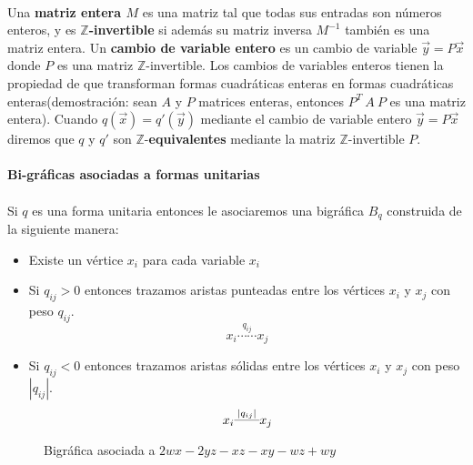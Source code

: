 \paragraph*{}
Una \textbf{matriz entera $M$} es una matriz tal que todas sus entradas son números enteros, y es $\mathbb{Z}$\textbf{-invertible} si además su matriz inversa $M^{-1}$ también es una matriz entera. Un \textbf{cambio de variable entero} es un cambio de variable $\overrightarrow{y} = P\overrightarrow{x}$ donde $P$ es una matriz $\mathbb{Z}$-invertible. Los cambios de variables enteros tienen la propiedad de que transforman formas cuadráticas enteras en formas cuadráticas enteras(demostración: sean $A$ y $P$ matrices enteras, entonces $P^{T}~A~P$ es una matriz entera). Cuando $q(\overrightarrow{x}) = q'(\overrightarrow{y})$ mediante el cambio de variable entero $\overrightarrow{y} = P\overrightarrow{x}$ diremos que $q$ y $q'$ son $\mathbb{Z}$-\textbf{equivalentes} mediante la matriz $\mathbb{Z}$-invertible $P$.

\paragraph*{}
\textbf{Bi-gráficas asociadas a formas unitarias}

\paragraph*{}
Si $q$ es una forma unitaria entonces le asociaremos una bigráfica \textbf{$B$}$_{q}$ construida de la siguiente manera:

\begin{itemize}
    \item Existe un vértice $x_{i}$ para cada variable $x_{i}$
    \item Si $q_{ij} > 0$ entonces trazamos aristas punteadas entre los vértices $x_{i}$ y $x_{j}$ con peso $q_{ij}$.$$x_{i}\overset{q_{ij}}{\cdots\cdots}x_{j}$$
    
    \item Si $q_{ij} < 0$ entonces trazamos aristas sólidas entre los vértices $x_{i}$ y $x_{j}$ con peso $|q_{ij}|$.$$x_{i}\overset{|q_{ij}|}{\rule[1mm]{7mm}{0.1mm}}x_{j}$$
\end{itemize}

\begin{figure}[H]
\begin{center}
\caption{Bigráfica asociada a  $2wx -2yz - xz - xy - wz + wy$}
\label{figura:1.1}
\end{center}
\end{figure}


